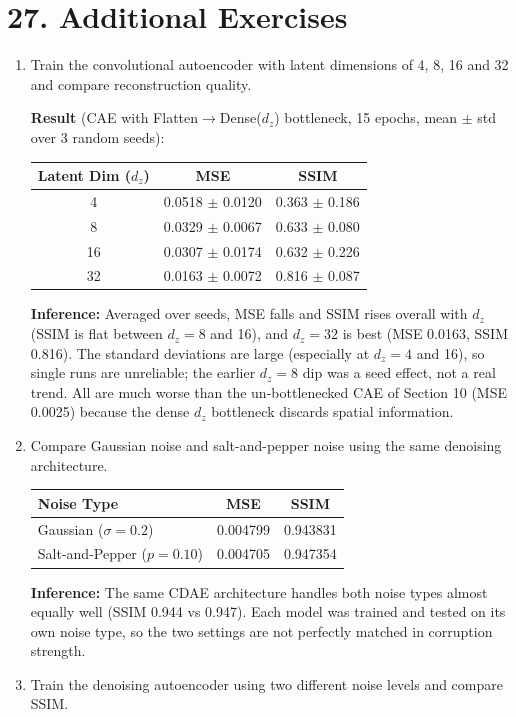\documentclass[10pt]{article}
\begin{document}
\section*{27. Additional Exercises}

\begin{enumerate}
\item Train the convolutional autoencoder with latent dimensions of 4, 8, 16
and 32 and compare reconstruction quality.

\textbf{Result} (CAE with Flatten$\rightarrow$Dense($d_z$) bottleneck, 15 epochs, mean $\pm$ std over 3 random seeds):

\begin{center}
\begin{tabular}{|c|c|c|}
\hline
Latent Dim ($d_z$) & MSE & SSIM\\
\hline
4 & 0.0518 $\pm$ 0.0120 & 0.363 $\pm$ 0.186 \\
8 & 0.0329 $\pm$ 0.0067 & 0.633 $\pm$ 0.080 \\
16 & 0.0307 $\pm$ 0.0174 & 0.632 $\pm$ 0.226 \\
32 & 0.0163 $\pm$ 0.0072 & 0.816 $\pm$ 0.087\\
\hline
\end{tabular}
\end{center}
\textbf{Inference:} Averaged over seeds, MSE falls and SSIM rises overall with $d_z$ (SSIM is flat between $d_z=8$ and 16), and $d_z=32$ is best (MSE 0.0163, SSIM 0.816). The standard deviations are large (especially at $d_z=4$ and 16), so single runs are unreliable; the earlier $d_z=8$ dip was a seed effect, not a real trend. All are much worse than the un-bottlenecked CAE of Section 10 (MSE 0.0025) because the dense $d_z$ bottleneck discards spatial information.
\item Compare Gaussian noise and salt-and-pepper noise using the same denoising
architecture.

\begin{center}
\begin{tabular}{|l|c|c|}
\hline
Noise Type & MSE & SSIM\\
\hline
Gaussian ($\sigma=0.2$) & 0.004799 & 0.943831 \\
Salt-and-Pepper ($p=0.10$) & 0.004705 & 0.947354\\
\hline
\end{tabular}
\end{center}
\textbf{Inference:} The same CDAE architecture handles both noise types almost equally well (SSIM 0.944 vs 0.947). Each model was trained and tested on its own noise type, so the two settings are not perfectly matched in corruption strength.
\item Train the denoising autoencoder using two different noise levels and
compare SSIM.


\end{enumerate}
\end{document}
